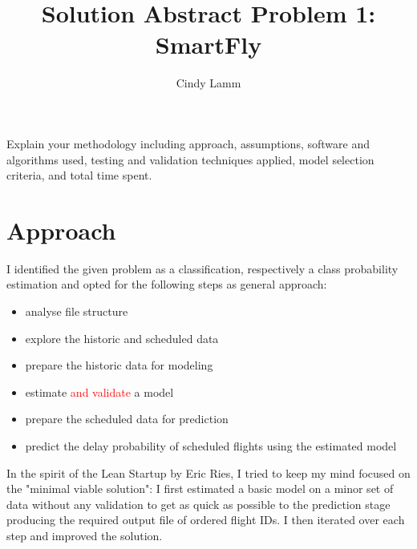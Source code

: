 \documentclass{article}
\author{Cindy Lamm}
\title{Solution Abstract Problem 1: SmartFly}
\begin{document}
\VerbatimFootnotes
\maketitle

Explain your methodology including approach, assumptions, software and algorithms used, testing and validation techniques applied, model selection criteria, and total time spent.


\section{Approach} %
\label{approach}

I identified the given problem as a classification, respectively a class probability estimation and opted for the following steps as general approach:
\begin{itemize}
	\item analyse file structure
	\item explore the historic and scheduled data
	\item prepare the historic data for modeling
	\item estimate \textcolor{red}{and validate} a model
	\item prepare the scheduled data for prediction
	\item predict the delay probability of scheduled flights using the estimated model
\end{itemize}



In the spirit of the Lean Startup by Eric Ries, I tried to keep my mind focused on the "minimal viable solution": I first estimated a basic model on a minor set of data without any validation to get as quick as possible to the prediction stage producing the required output file of ordered flight IDs. I then iterated over each step and improved the solution.
\end{document}
